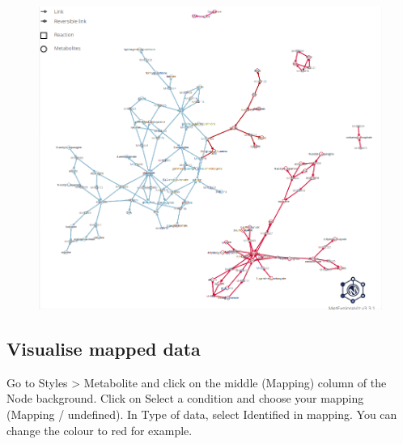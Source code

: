 \documentclass[
  24px,
  letterpaper,
  DIV=11,
  numbers=noendperiod]{scrartcl}
\begin{document}
\begin{figure}

{\centering \includegraphics{images/metexplore_viz_compartments.png}

}

\end{figure}

\hypertarget{visualise-mapped-data}{%
\subsection{Visualise mapped data}\label{visualise-mapped-data}}

Go to Styles \textgreater{} Metabolite and click on the middle (Mapping)
column of the Node background. Click on Select a condition and choose
your mapping (Mapping / undefined). In Type of data, select Identified
in mapping. You can change the colour to red for example.
\end{document}
